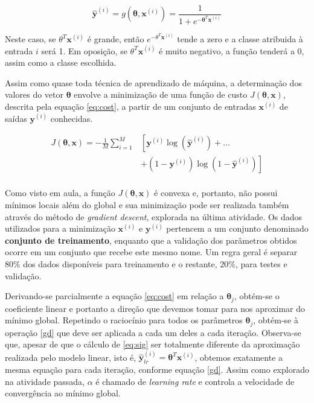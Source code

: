 \documentclass[10pt,twocolumn,letterpaper]{article}
\begin{document}
\begin{equation}
\label {eq:sig}
\bm{\hat{y}}^{(i)} = g \left(\bm{\theta},\bm{x}^{(i)}\right) = \frac {1}{1 + e^{-\bm{\theta}^T\bm{x}^{(i)}}}
\end{equation}

Neste caso, se \(\theta^T\bm{x}^{(i)}\) é grande, então \(e^{-\theta^T\bm{x}^{(i)}}\) tende a zero e a classe atribuida à entrada \(i\) será 1. Em oposição, se \(\theta^T\bm{x}^{(i)}\) é muito negativo, a função tenderá a 0, assim como a classe escolhida.

Assim como quase toda técnica de aprendizado de máquina, a determinação dos valores do vetor \(\bm{\theta}\) envolve a minimização de uma função de custo \(J(\bm{\theta}, \bm{x})\), descrita pela equação \ref{eq:cost}, a partir de um conjunto de entradas \(\bm{x}^{(i)}\) de saídas \(\bm{y}^{(i)}\) conhecidas.

\begin{equation}
\begin{split}
\label {eq:cost}
J(\bm{\theta}, \bm{x}) = -\frac{1}{M} \displaystyle\sum_{i=1}^{M} & \left[ \bm{y}^{(i)}\log \left( \bm{\hat{y}}^{(i)} \right) + \ldots \right. \\
& \left.  + \left(1 -\bm{y}^{(i)}\right)\log \left(1 - \bm{\hat{y}}^{(i)} \right) \right] \\
\end{split}
\end{equation}

Como visto em aula, a função \(J(\bm{\theta}, \bm{x})\) é convexa e, portanto, não possui mínimos locais além do global e sua minimização pode ser realizada também através do método de \textit {gradient descent}, explorada na última atividade. Os dados utilizados para a minimização \(\bm{x}^{(i)}\) e \(\bm{y}^{(i)}\) pertencem a um conjunto denominado \textbf{conjunto de treinamento}, enquanto que a validação dos parâmetros obtidos ocorre em um conjunto que recebe este mesmo nome. Um regra geral é separar 80\% dos dados disponíveis para treinamento e o restante, 20\%, para testes e validação.

Derivando-se parcialmente a equação \ref{eq:cost} em relação a \(\bm{\theta}_j\), obtém-se o coeficiente linear e portanto a direção que devemos tomar para nos aproximar do mínimo global. Repetindo o raciocínio para todos os parâmetros \(\bm{\theta}_j\), obtém-se à operação \ref{gd} que deve ser aplicada a cada um deles a cada iteração. Observa-se que, apesar de que o cálculo de \ref {eq:sig} ser totalmente diferente da aproximação realizada pelo modelo linear, isto é, \(\bm{\hat{y}}^{(i)}_{lr} = \bm{\theta}^T\bm{x}^{(i)}\), obtemos exatamente a mesma equação para cada iteração, conforme equação \ref{gd}. Assim como explorado na atividade passada, \(\alpha\) é chamado de \textit{learning rate} e controla a velocidade de convergência ao mínimo global.
\end{document}

